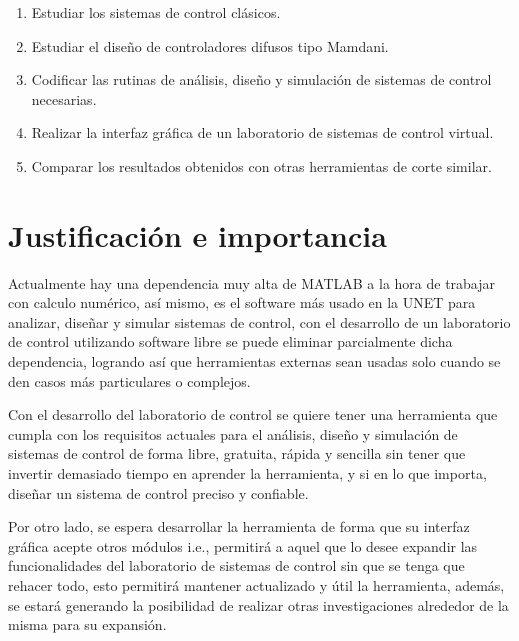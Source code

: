 		\begin{enumerate}[leftmargin=\parindent]
			
			\item Estudiar los sistemas de control clásicos.
			
			\item Estudiar el diseño de controladores difusos tipo Mamdani.
			
			\item Codificar las rutinas de análisis, diseño y simulación de sistemas de control necesarias.
			
			\item Realizar la interfaz gráfica de un laboratorio de sistemas de control virtual.
			
			\item Comparar los resultados obtenidos con otras herramientas de corte similar.
		
	\end{enumerate}

\section{Justificación e importancia}
	
	Actualmente hay una dependencia muy alta de MATLAB a la hora de trabajar con calculo numérico, así mismo, es el software más usado en la UNET para analizar, diseñar y simular sistemas de control, con el desarrollo de un laboratorio de control utilizando software libre se puede eliminar parcialmente dicha dependencia, logrando así que herramientas externas sean usadas solo cuando se den casos más particulares o complejos.
	
	Con el desarrollo del laboratorio de control se quiere tener una herramienta que cumpla con los requisitos actuales para el análisis, diseño y simulación de sistemas de control de forma libre, gratuita, rápida y sencilla sin tener que invertir demasiado tiempo en aprender la herramienta, y si en lo que importa, diseñar un sistema de control preciso y confiable.
	
	Por otro lado, se espera desarrollar la herramienta de forma que su interfaz gráfica acepte otros módulos i.e., permitirá a aquel que lo desee expandir las funcionalidades del laboratorio de sistemas de control sin que se tenga que rehacer todo, esto permitirá mantener actualizado y útil la herramienta, además, se estará generando la posibilidad de realizar otras investigaciones alrededor de la misma para su expansión.
	
